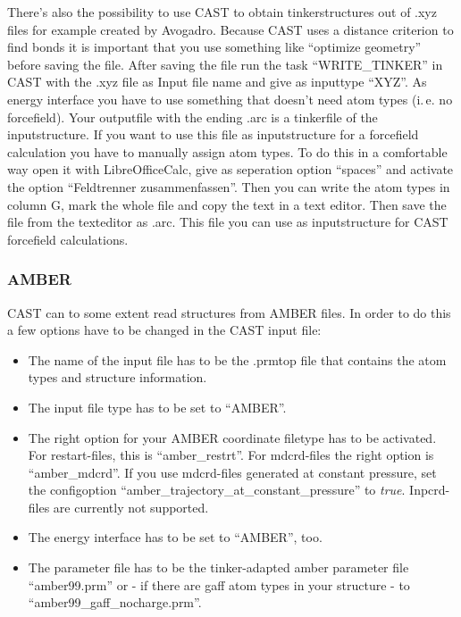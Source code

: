 \documentclass[10pt,a4paper]{article} %
\begin{document}
	There's also the possibility to use CAST to obtain tinkerstructures out of .xyz files for example created by Avogadro. Because CAST uses a distance criterion to find bonds it is important that you use something like ``optimize geometry'' before saving the file. After saving the file run the task ``WRITE\_TINKER'' in CAST with the .xyz file as Input file name and give as inputtype ``XYZ''. As energy interface you have to use something that doesn't need atom types (i.\,e. no forcefield). Your outputfile with the ending .arc is a tinkerfile of the inputstructure. If you want to use this file as inputstructure for a forcefield calculation you have to manually assign atom types. To do this in a comfortable way open it with LibreOfficeCalc, give as seperation option ``spaces'' and activate the option ``Feldtrenner zusammenfassen''. Then you can write the atom types in column G, mark the whole file and copy the text in a text editor. Then save the file from the texteditor as .arc. This file you can use as inputstructure for CAST forcefield calculations.
	
	\subsubsection{AMBER}

\ac{CAST} can to some extent read structures from \ac{AMBER} files. In order to do this a few options have to be changed in the CAST input file:
\begin{itemize}
\item The name of the input file has to be the .prmtop file that contains the atom types and structure information.
\item The input file type has to be set to ``AMBER''.
\item The right option for your AMBER coordinate filetype has to be activated. For restart-files, this is ``amber\_restrt''. For mdcrd-files the right option is ``amber\_mdcrd''. If you use mdcrd-files generated at constant pressure, set the configoption ``amber\_trajectory\_at\_constant\_pressure'' to \textit{true}. Inpcrd-files are currently not supported.
\item The energy interface has to be set to ``AMBER'', too.
\item The parameter file has to be the tinker-adapted amber parameter file ``amber99.prm'' or - if there are gaff atom types in your structure - to ``amber99\_gaff\_nocharge.prm''.
\end{itemize}
\end{document}
